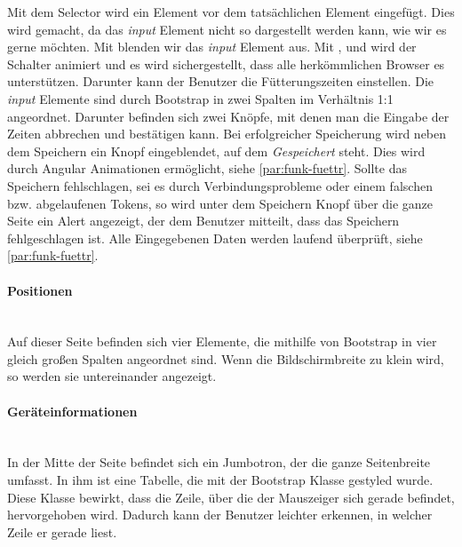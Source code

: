Mit dem  Selector wird ein Element vor dem tatsächlichen Element eingefügt. Dies wird gemacht, da das \textit{input} Element nicht so dargestellt werden kann, wie wir es gerne möchten. Mit  blenden wir das \textit{input} Element aus. Mit ,  und  wird der Schalter animiert und es wird sichergestellt, dass alle herkömmlichen Browser es unterstützen. Darunter kann der Benutzer die Fütterungszeiten einstellen. Die \textit{input} Elemente sind durch Bootstrap in zwei Spalten im Verhältnis 1:1 angeordnet. Darunter befinden sich zwei Knöpfe, mit denen man die Eingabe der Zeiten abbrechen und bestätigen kann. Bei erfolgreicher Speicherung wird neben dem Speichern ein Knopf eingeblendet, auf dem \textit{Gespeichert} steht. Dies wird durch Angular Animationen ermöglicht, siehe \autoref{par:funk-fuettr}. Sollte das Speichern fehlschlagen, sei es durch Verbindungsprobleme oder einem falschen bzw. abgelaufenen Tokens, so wird unter dem Speichern Knopf über die ganze Seite ein Alert angezeigt, der dem Benutzer mitteilt, dass das Speichern fehlgeschlagen ist. Alle Eingegebenen Daten werden laufend überprüft, siehe \autoref{par:funk-fuettr}.

\paragraph*{Positionen}\mbox{}\\
Auf dieser Seite befinden sich vier Elemente, die mithilfe von Bootstrap in vier gleich großen Spalten angeordnet sind. Wenn die Bildschirmbreite zu klein wird, so werden sie untereinander angezeigt.

\paragraph*{Geräteinformationen}\mbox{}\\
In der Mitte der Seite befindet sich ein Jumbotron, der die ganze Seitenbreite umfasst. In ihm ist eine Tabelle, die mit der Bootstrap Klasse  gestyled wurde. Diese Klasse bewirkt, dass die Zeile, über die der Mauszeiger sich gerade befindet, hervorgehoben wird. Dadurch kann der Benutzer leichter erkennen, in welcher Zeile er gerade liest.

